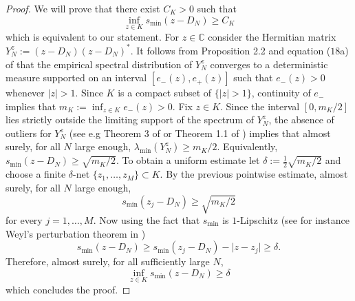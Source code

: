 \documentclass[12pt,a4paper]{amsart}
\theoremstyle{plain} %
\newcommand{\C}{\mathbb{C}}
\newcommand{\la}{\lambda}
\begin{document}
\begin{proof}
    We will prove that there exist $C_K>0$ such that 
    \begin{equation*}
        \inf_{z\in K}s_{\min}(z-D_N)\geq C_K
    \end{equation*}
    which is equivalent to our statement. For $z\in \C$ consider the Hermitian matrix $Y_N^z:=(z-D_N)(z-D_N)^*$. It follows from Proposition 2.2 and equation ($18$a) of \cite{CipolloniErdösSchröder} that the empirical spectral distribution of $Y_N^z$ converges to a deterministic measure supported on an interval $[e_{-}(z), e_{+}(z)]$ such that $e_{-}(z)>0$ whenever $\lvert z \lvert>1.$ Since $K$ is a compact subset of $\{\lvert z \lvert >1\}$, continuity of $e_{-}$ implies that $m_K:=\inf_{z\in K}e_-(z)>0$. Fix $z\in K$. Since the interval $[0,m_K/2]$ lies strictly outside the limiting support of the spectrum of $Y_N^z$, the absence of outliers for $Y_N^z$ (see e.g Theorem 3 of \cite{Vallet} or Theorem 1.1 of \cite{BaiSilverstein}) implies that almost surely, for all $N$ large enough, $\la_{\min}(Y_N^z)\geq m_K/2$. Equivalently, $s_{\min}(z-D_N)\geq \sqrt{m_K/2}$. To obtain a uniform estimate let $\delta:=\frac{1}{2}\sqrt{m_K/2}$ and choose a finite $\delta$-net $\{z_1,\ldots,z_M\}\subset K$. By the previous pointwise estimate, almost surely, for all $N$ large enough,
    \begin{equation*}
        s_{\min}(z_j-D_N)\geq \sqrt{m_K/2}
    \end{equation*}
    for every $j=1,\ldots,M.$ Now using the fact that $s_{\min}$ is $1$-Lipschitz (see for instance Weyl's perturbation theorem in \cite[Cor. III.2.6]{Bhatia})
    \begin{equation*}
        s_{\min}(z-D_N)\geq s_{\min}(z_j-D_N)-\lvert z-z_j\lvert \geq \delta.
    \end{equation*}
    Therefore, almost surely, for all sufficiently large $N$, 
    \begin{equation*}
        \inf_{z \in K}s_{\min}(z-D_N)\geq \delta
    \end{equation*}
    which concludes the proof.
\end{proof}
\end{document}
